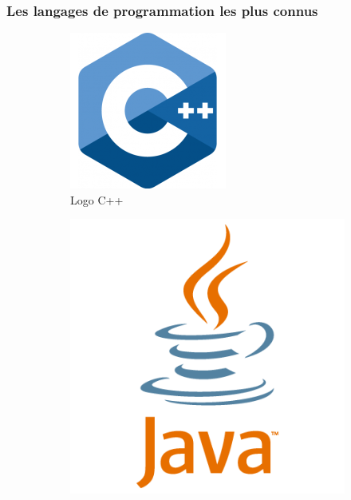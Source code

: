 \documentclass[12pt]{article}
\begin{document}
        \subsubsection{Les langages de programmation les plus connus}
        \begin{figure}[H]
            \centering
            \begin{subfigure}[b]{0.32\textwidth}
                \centering
                \includegraphics[width=\textwidth]{img/5_c++.png}
                \caption{Logo C++}
            \end{subfigure}
            \hfill
            \begin{subfigure}[b]{0.32\textwidth}
                \centering
                \includegraphics[width=\textwidth]{img/6_java.png}

\end{subfigure}
\end{figure}
\end{document}
